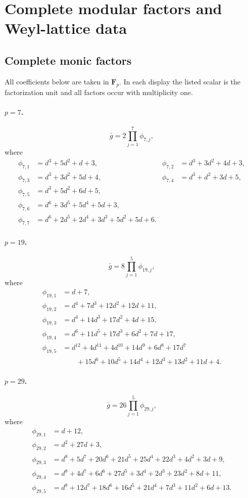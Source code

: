 \section{Complete modular factors and Weyl-lattice data}
\label{app:modular-data}

\subsection{Complete monic factors}

All coefficients below are taken in \(\mathbf F_p\).  In each display the
listed scalar is the factorization unit and all factors occur with
multiplicity one.

\paragraph{\(p=7\).}
\[
 \bar g=2\prod_{j=1}^{7}\phi_{7,j},
\]
where
\begin{align*}
\phi_{7,1}&=d^3+5d^2+d+3,&
\phi_{7,2}&=d^3+3d^2+4d+3,\\
\phi_{7,3}&=d^3+3d^2+5d+4,&
\phi_{7,4}&=d^3+d^2+3d+5,\\
\phi_{7,5}&=d^3+5d^2+6d+5,\\
\phi_{7,6}&=d^6+3d^5+5d^4+5d+3,\\
\phi_{7,7}&=d^6+2d^5+2d^4+3d^3+5d^2+5d+6.
\end{align*}

\paragraph{\(p=19\).}
\[
 \bar g=8\prod_{j=1}^{5}\phi_{19,j},
\]
where
\begin{align*}
\phi_{19,1}&=d+7,\\
\phi_{19,2}&=d^4+7d^3+12d^2+12d+11,\\
\phi_{19,3}&=d^4+14d^3+17d^2+4d+15,\\
\phi_{19,4}&=d^6+11d^5+17d^3+6d^2+7d+17,\\
\phi_{19,5}&=d^{12}+4d^{11}+4d^{10}+14d^9+6d^8+17d^7\\
&\qquad+15d^6+10d^5+14d^4+12d^3+13d^2+11d+4.
\end{align*}

\paragraph{\(p=29\).}
\[
 \bar g=26\prod_{j=1}^{5}\phi_{29,j},
\]
where
\begin{align*}
\phi_{29,1}&=d+12,\\
\phi_{29,2}&=d^2+27d+3,\\
\phi_{29,3}&=d^8+5d^7+20d^6+21d^5+25d^4+22d^3+4d^2+3d+9,\\
\phi_{29,4}&=d^8+4d^7+6d^6+27d^5+3d^4+2d^3+23d^2+8d+11,\\
\phi_{29,5}&=d^8+12d^7+18d^6+16d^5+21d^4+7d^3+11d^2+6d+13.
\end{align*}

